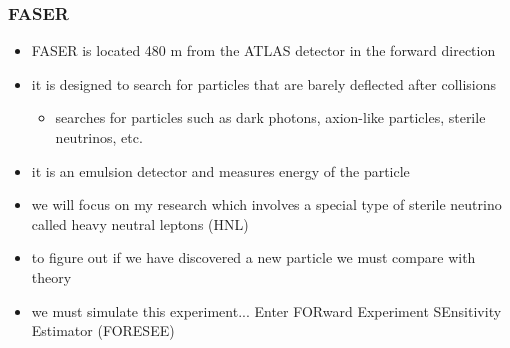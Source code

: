 \documentclass[
	11pt, %
]{beamer}
\begin{document}
\begin{frame}
\frametitle{FASER}
	\begin{itemize}
		\item FASER is located 480 m from the ATLAS detector in the forward direction
		\item it is designed to search for particles that are barely deflected after collisions
		\begin{itemize}
			\item searches for particles such as dark photons, axion-like particles, sterile neutrinos, etc.
		\end{itemize}
		\item it is an emulsion detector and measures energy of the particle
		\item we will focus on my research which involves a special type of sterile neutrino called heavy neutral leptons (HNL)
		\item to figure out if we have discovered a new particle we must compare with theory
		\item we must simulate this experiment... Enter FORward Experiment SEnsitivity Estimator (FORESEE)

	\end{itemize}
\end{frame}
\end{document}
